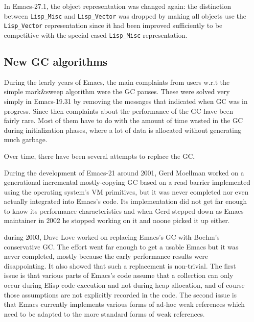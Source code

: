 \documentclass[format=acmsmall, review=false, screen=true]{acmart}
\newcommand \Elisp {Elisp}
\begin{document}
In Emacs-27.1, the object representation was changed again: the distinction
between \texttt{Lisp\_Misc} and \texttt{Lisp\_Vector} was dropped by making
all objects use the \texttt{Lisp\_Vector} representation since it had been
improved sufficiently to be competitive with the special-cased
\texttt{Lisp\_Misc} representation.


\subsection{New GC algorithms}
\label{sec:gc-algorithms}

During the learly years of Emacs, the main complaints from users w.r.t the
simple mark\&sweep algorithm were the GC pauses.  These were solved very
simply in Emacs-19.31 by removing the messages that indicated when GC was in
progress.  Since then complaints about the performance of the GC have been
fairly rare.  Most of them have to do with the amount of time wasted in the
GC during initialization phases, where a lot of data is allocated without
generating much garbage.

Over time, there have been several attempts to replace the GC.

During the development of Emacs-21 around 2001, Gerd Moellman worked on
a generational incremental mostly-copying GC based on a read barrier
implemented using the operating system's VM primitives, but it was never
completed nor even actually integrated into Emacs's code.
Its implementation did not get far enough to know its
performance characteristics and when Gerd stepped down as Emacs maintainer
in 2002 he stopped working on it and noone picked it up either.

during 2003, Dave Love worked on replacing Emacs's GC with Boehm's
conservative GC.  The effort went far enough to get a usable Emacs but it
was never completed, mostly because the early performance results were
disappointing.  It also showed that such a replacement is non-trivial.
The first issue is that various parts of Emacs's code assume that
a collection can only occur during \Elisp{} code execution and not during
heap allocation, and of course those assumptions are not explicitly recorded
in the code.  The second issue is that Emacs currently implements various
forms of ad-hoc weak references which need to be adapted to the more
standard forms of weak references.
\end{document}
